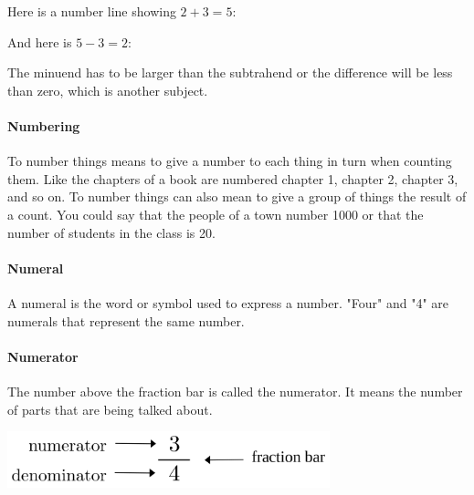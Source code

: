 \documentclass[12pt]{article}
\begin{document}
{Here is a number line showing $2+3=5$:


And here is $5-3=2$:

\begin{center}
\end{center}

The minuend has to be larger than the subtrahend or the difference will be less than zero, which is another subject.

\paragraph{Numbering} To number things means to give a number to each thing in turn when counting them. Like the chapters of a book are numbered chapter 1, chapter 2, chapter 3, and so on. To number things can also mean to give a group of things the result of a count. You could say that the people of a town number 1000 or that the number of students in the class is 20.

\paragraph{Numeral}
A numeral is the word or symbol used to express a number. "Four" and "4" are numerals that represent the same number.

\paragraph{Numerator}
The number above the fraction bar is called the numerator. It means the number of parts that are being talked about.

\begin{center}
\includegraphics[width=0.7\textwidth]{fraction diagram.png}
\end{center}

}
\end{document}

